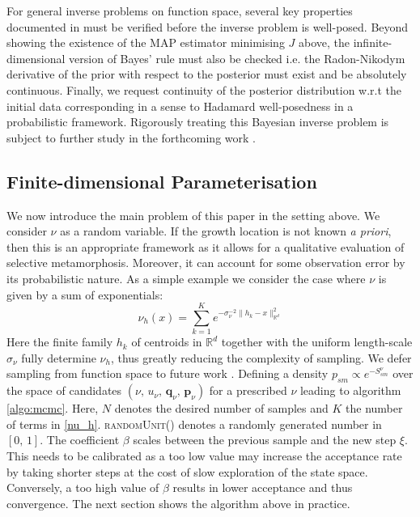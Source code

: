 \documentclass[runningheads]{llncs}
\newcommand{\Rd}{\mathbb{R}^{d}}
\begin{document}
For general inverse problems on function space, several key properties
documented in \cite{dashti2017bayesian} must be verified before the
inverse problem is well-posed. Beyond showing the existence of the MAP estimator
minimising $J$ above, the infinite-dimensional version of Bayes' rule must also
be checked i.e. the Radon-Nikodym derivative of the prior with respect to the
posterior must exist and be absolutely continuous. Finally, we request
continuity of the posterior distribution w.r.t the initial data corresponding in
a sense to Hadamard well-posedness in a probabilistic framework. Rigorously
treating this Bayesian inverse problem is subject to further study in the
forthcoming work \cite{bockarnaudoncotter2019}.

\subsection{Finite-dimensional Parameterisation}\label{subs:finite-dim-param}

We now introduce the main problem of this paper in the setting above. We
consider $\nu$ as a random variable. If the growth location is not known \emph{a
priori}, then this is an appropriate framework as it allows for a qualitative
evaluation of selective metamorphosis. Moreover, it can account for some
observation error by its probabilistic nature. As a simple example we consider
the case where $\nu$ is given by a sum of exponentials:
\begin{equation}\label{nu_h}
    \nu_h (x) = \sum_{k=1}^K e^{ -\sigma_\nu^{-2}\|h_k - x\|_{\Rd}^2}
\end{equation}
Here the finite family $h_k$ of centroids in $\Rd$ together with the uniform
length-scale $\sigma_\nu$ fully determine $\nu_h$, thus greatly reducing the
complexity of sampling. We defer sampling from function space to future work
\cite{bockarnaudoncotter2019}. Defining a density $p_{sm} \propto e^{-
S_{sm}^\nu}$ over the space of candidates $(\nu,\,u_\nu,\,\mathbf q_\nu,\,\mathbf
p_\nu)$ for a prescribed $\nu$ leading to algorithm \ref{algo:mcmc}. Here, $N$
denotes the desired number of samples and $K$ the number of terms in
\eqref{nu_h}. \textsc{randomUnit()} denotes a randomly generated number in
$[0,\,1]$. The coefficient $\beta$ scales between the previous sample and the
new step $\xi$. This needs to be calibrated as a too low value may increase the
acceptance rate by taking shorter steps at the cost of slow exploration of the
state space. Conversely, a too high value of $\beta$ results in lower acceptance
and thus convergence. The next section shows the algorithm above in practice.
\end{document}
